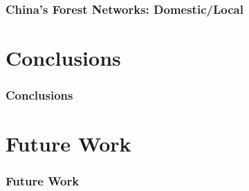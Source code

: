\documentclass[aspectratio=169]{beamer}
\begin{document}
\begin{frame}
  \frametitle{China's Forest Networks: Domestic/Local}
\end{frame}


\section{Conclusions}

\begin{frame}
  \frametitle{Conclusions}
\end{frame}

\section{Future Work}

\begin{frame}
  \frametitle{Future Work}
\end{frame}
\end{document}
